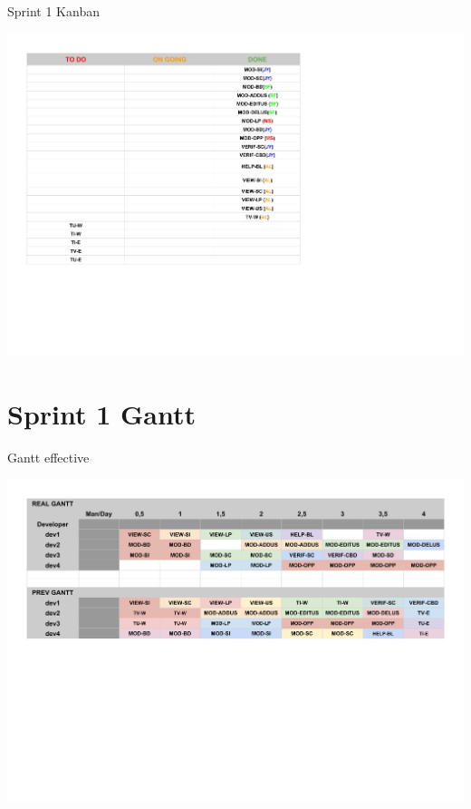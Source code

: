 \documentclass{beamer}
\begin{document}
\begin{frame}{Sprint 1 Kanban}
	\begin{center}
        \includegraphics[scale=0.43]{Kanban1.pdf}
        \end{center}
\end{frame}


\section{Sprint 1 Gantt }

\begin{frame}{Gantt effective}
	\begin{center}
        \includegraphics[scale=0.41]{Gantt1Real.pdf}
        \end{center}
\end{frame}
\end{document}
